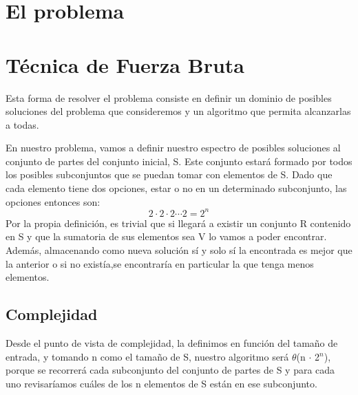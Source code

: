 \documentclass[10pt,a4paper]{article}
\begin{document}

\fecha{\today}



\maketitle

\newpage


\section{El problema}
	

\newpage
\section{Técnica de Fuerza Bruta}
\bigskip
Esta forma de resolver el problema consiste en definir un dominio de posibles soluciones del problema que consideremos y un algoritmo que permita alcanzarlas a todas. 

\bigskip

	En nuestro problema, vamos a definir nuestro espectro de posibles soluciones al conjunto de partes del conjunto inicial, S. Este conjunto estará formado por todos los posibles subconjuntos que se puedan tomar con elementos de S. Dado que cada elemento tiene dos opciones, estar o no en un determinado subconjunto, las opciones entonces son:
	\[2 \cdot 2 \cdot 2 \cdots 2 = 2^{n} \]	
Por la propia definición, es trivial que si llegará a existir un conjunto R contenido en S y que la sumatoria de sus elementos sea V lo vamos a poder encontrar. Además, almacenando como nueva solución sí y solo sí la encontrada es mejor que la anterior o si no existía,se encontraría en particular la que tenga menos elementos.

\bigskip
\subsection{Complejidad}
Desde el punto de vista de complejidad, la definimos en función del tamaño de entrada, y tomando n como el tamaño de S, nuestro algoritmo será $\theta$(n $\cdot$ 2$^{n}$), porque se recorrerá cada subconjunto del conjunto de partes de S y para cada uno revisaríamos cuáles de los n elementos de S están en ese subconjunto.
\end{document}
